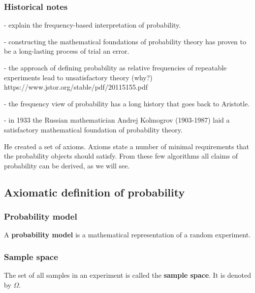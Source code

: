 \begin{frame}
\frametitle{Historical notes}

- explain the frequency-based interpretation of probability.

- constructing the mathematical foundations of probability theory has proven to be a long-lasting process of trial an error.  

- the approach of defining probability as relative frequencies of repeatable experiments lead to unsatisfactory theory (why?)
https://www.jstor.org/stable/pdf/20115155.pdf

- the frequency view of probability has a long history that goes back to Aristotle.

- in 1933 the Russian mathematician Andrej Kolmogrov (1903-1987) laid a satisfactory mathematical foundation of probability theory.

He created a set of axioms. Axioms state a number of minimal requirements that the probability objects should satisfy. From these few algorithms all claims of probability can be derived, as we will see.

\end{frame}

\subsection{Axiomatic definition of probability}

\begin{frame}
\frametitle{Probability model}

    \begin{probDef}
        A \textbf{probability model} is a mathematical representation of a
        random experiment. 
        \label{def:probabilityModel}
    \end{probDef}

\end{frame}

\begin{frame}
    \frametitle{Sample space}

    \begin{probDef}
        The set of all samples in an experiment is called the \textbf{sample
        space}. It is denoted by $\Omega$.
    \end{probDef}

\end{frame}

